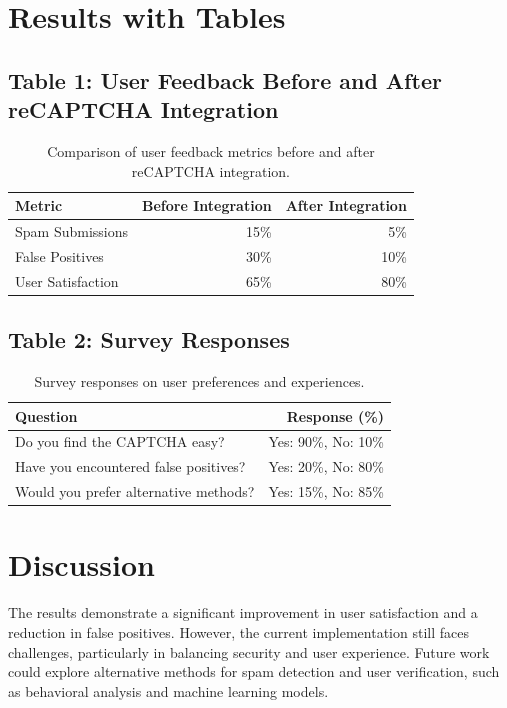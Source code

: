 \documentclass{article}
\begin{document}
\section{Results with Tables}
\subsection{Table 1: User Feedback Before and After reCAPTCHA Integration}
\begin{table}[ht]
\centering
\begin{tabular}{l|r|r}
\toprule
Metric & Before Integration & After Integration \\
\midrule
Spam Submissions & 15\% & 5\% \\
False Positives & 30\% & 10\% \\
User Satisfaction & 65\% & 80\% \\
\bottomrule
\end{tabular}
\caption{Comparison of user feedback metrics before and after reCAPTCHA integration.}
\label{tab:user-feedback}
\end{table}

\subsection{Table 2: Survey Responses}
\begin{table}[ht]
\centering
\begin{tabular}{l|r}
\toprule
Question & Response (\%) \\
\midrule
Do you find the CAPTCHA easy? & Yes: 90\%, No: 10\% \\
Have you encountered false positives? & Yes: 20\%, No: 80\% \\
Would you prefer alternative methods? & Yes: 15\%, No: 85\% \\
\bottomrule
\end{tabular}
\caption{Survey responses on user preferences and experiences.}
\label{tab:survey-responses}
\end{table}

\section{Discussion}
The results demonstrate a significant improvement in user satisfaction and a reduction in false positives. However, the current implementation still faces challenges, particularly in balancing security and user experience. Future work could explore alternative methods for spam detection and user verification, such as behavioral analysis and machine learning models.
\end{document}
